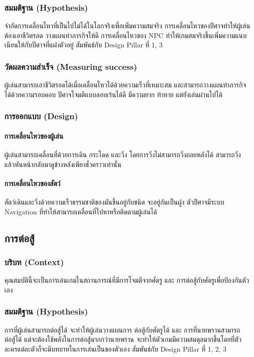 \subsubsection{สมมติฐาน (Hypothesis)}
จำกัดการเคลื่อนไหวที่เป็นไปไม่ได้ในโลกจริงเพื่อเพิ่มความสมจริง การเคลื่อนไหวของปีศาจทำให้ผู้เล่นต้องเอาชีวิตรอด วางแผนทำภารกิจให้ดี การเคลื่อนไหวของ NPC ทำให้เกมสมจริงขึ้นเพิ่มความแนบเนียนให้กับปีศาจที่แฝงตัวอยู่ สัมพันธ์กับ Design Pillar ที่ 1, 3

\subsubsection{วัดผลความสำเร็จ (Measuring success)}

ผู้เล่นสามารถเอาชีวิตรอดได้เมื่อเคลื่อนไหวได้ด้วยความเร็วที่เหมาะสม และสามารถวางแผนทำภารกิจได้ด้วยความรอบคอบ ปีศาจโจมตีแบบลอบเร้นได้ดี มีความยาก ท้าทาย แต่ยังเล่นผ่านไปได้

\subsubsection{การออกแบบ (Design)}

\paragraph{การเคลื่อนไหวของผู้เล่น}

ผู้เล่นสามารถเคลื่อนที่ด้วยการเดิน กระโดด และวิ่ง โดยการวิ่งไม่สามารถวิ่งถอยหลังได้ สามารถวิ่งแล้วหันหน้ากลับมาดูข้างหลังเพียงชั่วคราวเท่านั้น

\paragraph{การเคลื่อนไหวของสัตว์}

สัตว์เดินและวิ่งด้วยความเร็วธรรมชาติของมันขึ้นอยู่กับชนิด จะอยู่กันเป็นฝูง ตัวปีศาจมีระบบ Navigation ที่ทำให้สามารถเคลื่อนที่ไปหาหรือติดตามผู้เล่นได้

\subsection{การต่อสู้}

\subsubsection{บริบท (Context)}
คุณสมบัตินี้จะเป็นการเล่นเกมในสถานการณ์ที่มีการโจมตีจากศัตรู และ การต่อสู้กับศัตรูเพื่อป้องกันตัวเอง 

\subsubsection{สมมติฐาน (Hypothesis)}
การที่ผู้เล่นสามารถต่อสู้ได้ จะทำให้ผู้เล่นวางแผนการ ต่อสู้กับศัตรูได้ และ การที่นายพรานสามารถต่อสู้ได้ แต่จะต้องใช้พลังในการต่อสู้มากกว่านายพราน จะทำให้ตัวเกมมีความสมดุลมากขึ้นโดยที่ตัวละครแต่ละตัวก็จะมีบทบาทในการเล่นเป็นของตัวเอง สัมพันธ์กับ Design Pillar ที่ 1, 2, 3

